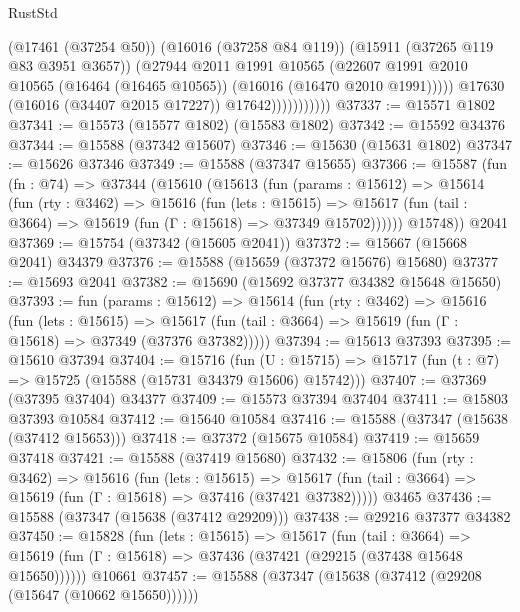 \begin{lexlean}{RustStd}
\begin{coremodule}
                            (@17461 (@37254 @50))
                            (@16016 (@37258 @84 @119))
                            (@15911 (@37265 @119 @83 @3951 @3657))
                            (@27944
                              @2011
                              @1991
                              @10565
                              (@22607
                                @1991
                                @2010
                                @10565
                                (@16464 (@16465 @10565))
                                (@16016 (@16470 @2010 @1991)))))
                          @17630
                          (@16016 (@34407 @2015 @17227))
                          @17642)))))))))))
@37337 := @15571 @1802
@37341 := @15573 (@15577 @1802) (@15583 @1802)
@37342 := @15592 @34376
@37344 := @15588 (@37342 @15607)
@37346 := @15630 (@15631 @1802)
@37347 := @15626 @37346
@37349 := @15588 (@37347 @15655)
@37366 := @15587
    (fun (fn : @74) =>
    @37344
      (@15610
        (@15613
          (fun (params : @15612) =>
          @15614
            (fun (rty : @3462) =>
            @15616
              (fun (lets : @15615) =>
              @15617 (fun (tail : @3664) => @15619 (fun (Γ : @15618) => @37349 @15702))))))
        @15748))
    @2041
@37369 := @15754 (@37342 (@15605 @2041))
@37372 := @15667 (@15668 @2041) @34379
@37376 := @15588 (@15659 (@37372 @15676) @15680)
@37377 := @15693 @2041
@37382 := @15690 (@15692 @37377 @34382 @15648 @15650)
@37393 := fun (params : @15612) =>
  @15614
    (fun (rty : @3462) =>
    @15616
      (fun (lets : @15615) =>
      @15617 (fun (tail : @3664) => @15619 (fun (Γ : @15618) => @37349 (@37376 @37382)))))
@37394 := @15613 @37393
@37395 := @15610 @37394
@37404 := @15716
    (fun (U : @15715) => @15717 (fun (t : @7) => @15725 (@15588 (@15731 @34379 @15606) @15742)))
@37407 := @37369 (@37395 @37404) @34377
@37409 := @15573 @37394 @37404
@37411 := @15803 @37393 @10584
@37412 := @15640 @10584
@37416 := @15588 (@37347 (@15638 (@37412 @15653)))
@37418 := @37372 (@15675 @10584)
@37419 := @15659 @37418
@37421 := @15588 (@37419 @15680)
@37432 := @15806
    (fun (rty : @3462) =>
    @15616
      (fun (lets : @15615) =>
      @15617 (fun (tail : @3664) => @15619 (fun (Γ : @15618) => @37416 (@37421 @37382)))))
    @3465
@37436 := @15588 (@37347 (@15638 (@37412 @29209)))
@37438 := @29216 @37377 @34382
@37450 := @15828
    (fun (lets : @15615) =>
    @15617
      (fun (tail : @3664) =>
      @15619 (fun (Γ : @15618) => @37436 (@37421 (@29215 (@37438 @15648 @15650))))))
    @10661
@37457 := @15588 (@37347 (@15638 (@37412 (@29208 (@15647 (@10662 @15650))))))

\end{coremodule}
\end{lexlean}
